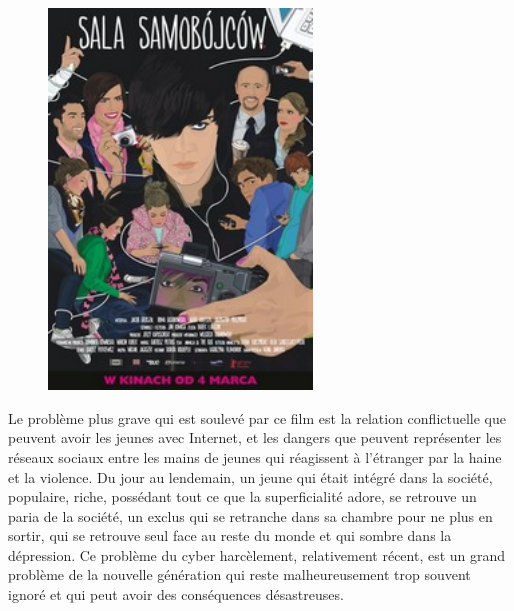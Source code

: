 \documentclass[12pt, twocolumn]{amsart}
\begin{document}
\begin{figure}

\includegraphics[width=7cm]{sala.jpg}

\end{figure}
\clearpage
Le problème plus grave qui est soulevé par ce film est la relation conflictuelle que peuvent avoir les jeunes avec Internet, et les dangers que peuvent représenter les réseaux sociaux entre les mains de jeunes qui réagissent à l’étranger par la haine et la violence. Du jour au lendemain, un jeune qui était intégré dans la société, populaire, riche, possédant tout ce que la superficialité adore, se retrouve un paria de la société, un exclus qui se retranche dans sa chambre pour ne plus en sortir, qui se retrouve seul face au reste du monde et qui sombre dans la dépression. Ce problème du cyber harcèlement, relativement récent, est un grand problème de la nouvelle génération qui reste malheureusement trop souvent ignoré et qui peut avoir des conséquences désastreuses. 
\end{document}

